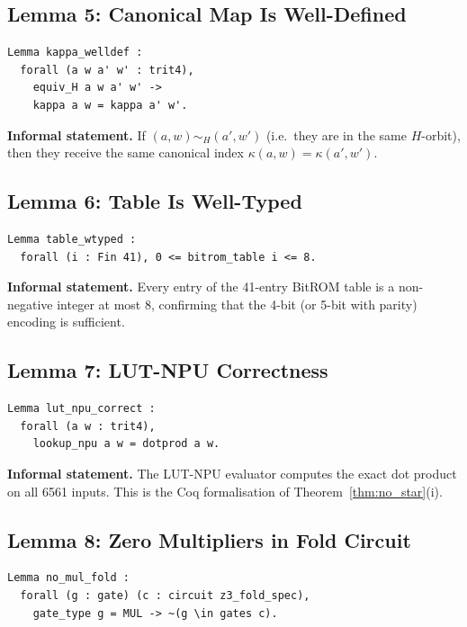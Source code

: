 \subsection{Lemma 5: Canonical Map Is Well-Defined}
\label{lem:kappa_welldef}

\begin{verbatim}
Lemma kappa_welldef :
  forall (a w a' w' : trit4),
    equiv_H a w a' w' ->
    kappa a w = kappa a' w'.
\end{verbatim}

\noindent\textbf{Informal statement.}
If \((a,w) \sim_H (a',w')\) (i.e.\ they are in the same \(H\)-orbit),
then they receive the same canonical index \(\kappa(a,w) = \kappa(a',w')\).

\subsection{Lemma 6: Table Is Well-Typed}
\label{lem:table_wtyped}

\begin{verbatim}
Lemma table_wtyped :
  forall (i : Fin 41), 0 <= bitrom_table i <= 8.
\end{verbatim}

\noindent\textbf{Informal statement.}
Every entry of the 41-entry BitROM table is a non-negative integer
at most 8, confirming that the 4-bit (or 5-bit with parity) encoding
is sufficient.

\subsection{Lemma 7: LUT-NPU Correctness}
\label{lem:lut_correct}

\begin{verbatim}
Lemma lut_npu_correct :
  forall (a w : trit4),
    lookup_npu a w = dotprod a w.
\end{verbatim}

\noindent\textbf{Informal statement.}
The LUT-NPU evaluator computes the exact dot product on all 6561 inputs.
This is the Coq formalisation of Theorem~\ref{thm:no_star}(i).

\subsection{Lemma 8: Zero Multipliers in Fold Circuit}
\label{lem:no_mul_fold}

\begin{verbatim}
Lemma no_mul_fold :
  forall (g : gate) (c : circuit z3_fold_spec),
    gate_type g = MUL -> ~(g \in gates c).
\end{verbatim}


